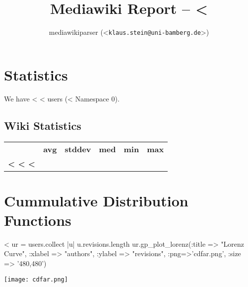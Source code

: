 \documentclass{scrartcl}
\title{Mediawiki Report -- <%
}
\author{mediawikiparser (<\texttt{klaus.stein@uni-bamberg.de}>)}
\begin{document}
\maketitle


\section{Statistics} %
\label{sec:statistics}

We have <%
<%
users (<%
Namespace 0).

\subsection{Wiki Statistics} %
\label{sub:wiki_statistics}

\begin{tabular}{>{\bfseries}lrrrrr}
  &\textbf{avg} &\textbf{stddev} &\textbf{med} &\textbf{min} &\textbf{max}\\
  <%
  <%
  <%
\end{tabular}








\section{Cummulative Distribution Functions} %
\label{sec:cummulative_distribution_functions}

<%
ur = users.collect { |u| u.revisions.length }
ur.gp_plot_lorenz(:title => "Lorenz Curve", :xlabel => "authors", :ylabel => "revisions", :png=>'cdfar.png', :size => '480,480')
\begin{center}
  \texttt{[image: cdfar.png]}
\end{center}
\end{document}
